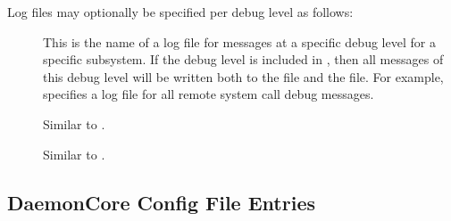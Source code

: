 Log files may optionally be specified per debug level as follows:
\begin{description}

\item[] \label{param:SubsysLevelLog} This is
  the name of a log file for messages at a specific debug level for a
  specific subsystem.  If the debug level is included in
  , then all messages of this debug level will be
  written both to the  file and the
   file.  For example,
   specifies a log file for all remote
  system call debug messages.

\item[] \label{param:MaxSubsysLevelLog}
  Similar to .

\item[]
  \label{param:TruncSubsysLevelLogOnOpen} Similar to
  .

\end{description}

\subsection{\label{sec:DaemonCore-Config-File-Entries}
DaemonCore Config File Entries}

